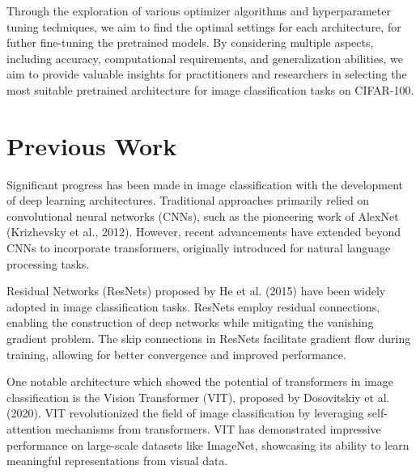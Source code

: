\documentclass{article}
\begin{document}
Through the exploration of various optimizer algorithms and hyperparameter tuning techniques, we aim to find the optimal settings for each architecture, 
for futher fine-tuning the pretrained models. 
By considering multiple aspects, including accuracy, computational requirements, and generalization abilities, we aim to provide valuable insights for practitioners and researchers in selecting the most suitable pretrained architecture for image classification tasks on CIFAR-100.

\section{Previous Work}
Significant progress has been made in image classification with the development of deep learning architectures. Traditional approaches primarily relied on convolutional neural networks (CNNs), such as the pioneering work of AlexNet (Krizhevsky et al., 2012). However, recent advancements have extended beyond CNNs to incorporate transformers, originally introduced for natural language processing tasks.

Residual Networks (ResNets) proposed by He et al. (2015) have been widely adopted in image classification tasks. ResNets employ residual connections, enabling the construction of deep networks while mitigating the vanishing gradient problem. The skip connections in ResNets facilitate gradient flow during training, allowing for better convergence and improved performance.

One notable architecture which showed the potential of transformers in image classification is the Vision Transformer (VIT), proposed by Dosovitskiy et al. (2020).
VIT revolutionized the field of image classification by leveraging self-attention mechanisms from transformers.
VIT has demonstrated impressive performance on large-scale datasets like ImageNet, showcasing its ability to learn meaningful representations from visual data.
\end{document}
